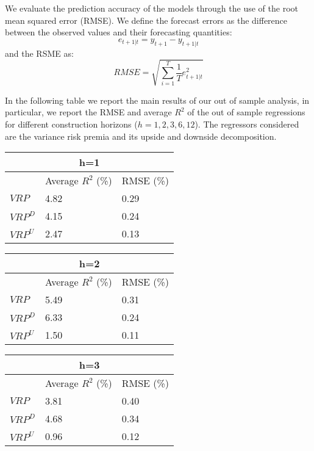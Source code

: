 \vspace{4mm}
 We evaluate the prediction accuracy of the models through the use of the root mean squared error (RMSE). We define the forecast errors as the difference between the observed values and their forecasting quantities:
 \begin{equation}
 e_{t+1|t}=y_{t+1}-y_{t+1|t}
 \end{equation}
 and the RSME as: 
  \begin{equation}
 RMSE=\sqrt{\sum_{i=1}^T \frac{1}{T} e_{t+1|t}^2 }
  \end{equation}
  
\vspace{4mm}
In the following table we report the main results of our out of sample analysis, in particular, we report the RMSE and average $R^2$ of the out of sample regressions for different construction horizons ($h=1,2,3,6,12$). The regressors considered are the variance risk premia and its upside and downside decomposition. 


\begin{tabular}{ p{2cm}||p{4cm}|p{4cm} }
 \hline
 \multicolumn{3}{c}{\textbf{h=1}} \\
 \hline
 & Average $R^2$ (\%) &  RMSE (\%)   \\
 \hline
 $VRP$&   4.82  & 0.29  \\
  $VRP^D$   & 4.15    & 0.24\\
 $VRP^U$ &2.47 & 0.13 \\
  \hline
\end{tabular}

\vspace{2mm}
\begin{tabular}{ p{2cm}||p{4cm}|p{4cm} }
  \hline
 \multicolumn{3}{c}{\textbf{h=2}} \\
 \hline
 & Average $R^2$ (\%) &  RMSE (\%)  \\
 \hline
 $VRP$&   5.49  & 0.31  \\
 $VRP^D$   & 6.33    & 0.24 \\
 $VRP^U$ &1.50 & 0.11 \\
 \hline
\end{tabular}

\vspace{2mm}
\begin{tabular}{ p{2cm}||p{4cm}|p{4cm} }
  \hline
  \multicolumn{3}{c}{\textbf{h=3}} \\
 \hline
 & Average $R^2$ (\%) &  RMSE (\%)  \\
 \hline
 $VRP$&   3.81  & 0.40  \\
  $VRP^D$   & 4.68    & 0.34 \\
 $VRP^U$ &0.96 & 0.12 \\
 \hline
\end{tabular}

